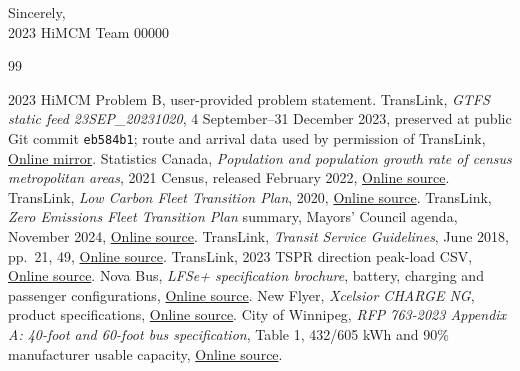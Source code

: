 \documentclass[12pt,letterpaper]{article}
\begin{document}
Sincerely,\\
2023 HiMCM Team 00000

\newpage
{}
\begin{thebibliography}{99}
\small
\raggedright
\setlength{\itemsep}{0.1em}
 2023 HiMCM Problem B, user-provided problem statement.
 TransLink, \emph{GTFS static feed 23SEP\_20231020}, 4 September--31 December 2023, preserved at public Git commit \texttt{eb584b1}; route and arrival data used by permission of TransLink, \href{https://github.com/JaydenCWong/JAAM-project/tree/eb584b1108b0d582ae31c7db8e0d7e7b5ba1702b/backend/engine/translink_data}{Online mirror}.
 Statistics Canada, \emph{Population and population growth rate of census metropolitan areas}, 2021 Census, released February 2022, \href{https://www150.statcan.gc.ca/n1/daily-quotidien/220209/t002a-eng.htm}{Online source}.
 TransLink, \emph{Low Carbon Fleet Transition Plan}, 2020, \href{https://www.translink.ca/-/media/translink/documents/about-translink/policies/translink_low_carbon_fleet_transition_plan_2020_02_24.pdf}{Online source}.
 TransLink, \emph{Zero Emissions Fleet Transition Plan} summary, Mayors' Council agenda, November 2024, \href{https://www.translink.ca/-/media/translink/documents/about-translink/governance-and-board/council-minutes-and-reports/2024/november/agenda--mayors-council--public-mtg--nov-28-2024.pdf}{Online source}.
 TransLink, \emph{Transit Service Guidelines}, June 2018, pp.~21, 49, \href{https://www.translink.ca/-/media/translink/documents/plans-and-projects/managing-the-transit-network/transit-oriented-communities/transit-services-guidelines-public-summary.pdf}{Online source}.
 TransLink, 2023 TSPR direction peak-load CSV, \href{https://www.translink.ca/-/media/translink/documents/plans-and-projects/managing-the-transit-network/tspr/csv-data/2023/tspr2023_bus_peakload_yearlinedaytypeseasontimerangedirection.csv}{Online source}.
 Nova Bus, \emph{LFSe+ specification brochure}, battery, charging and passenger configurations, \href{https://us.novabus.com/wp-content/uploads/sites/2/2019/10/LFSe_brochure_march2021_EN.pdf}{Online source}.
 New Flyer, \emph{Xcelsior CHARGE NG}, product specifications, \href{https://www.newflyer.com/bus/xcelsior-charge-ng/}{Online source}.
 City of Winnipeg, \emph{RFP 763-2023 Appendix A: 40-foot and 60-foot bus specification}, Table 1, 432/605 kWh and 90\% manufacturer usable capacity, \href{https://legacy.winnipeg.ca/finance/findata/matmgt/documents/2023/763-2023/763-2023_Appendix_A_Bus_Specification.pdf}{Online source}.

\end{thebibliography}
\end{document}
